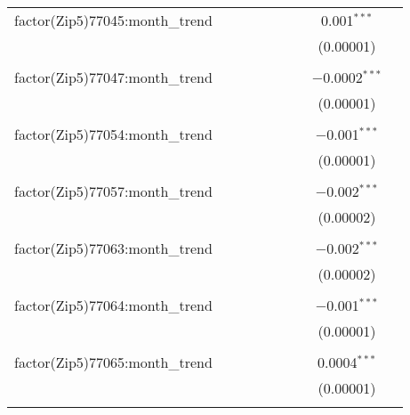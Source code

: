 \begin{table}[H]
{\begin{tabular}{@{\extracolsep{5pt}}lcccccccc}
  factor(Zip5)77045:month\_trend &  &  &  &  &  &  & 0.001$^{***}$ &  \\  

   &  &  &  &  &  &  & (0.00001) &  \\  

   & & & & & & & & \\  

  factor(Zip5)77047:month\_trend &  &  &  &  &  &  & $-$0.0002$^{***}$ &  \\  

   &  &  &  &  &  &  & (0.00001) &  \\  

   & & & & & & & & \\  

  factor(Zip5)77054:month\_trend &  &  &  &  &  &  & $-$0.001$^{***}$ &  \\  

   &  &  &  &  &  &  & (0.00001) &  \\  

   & & & & & & & & \\  

  factor(Zip5)77057:month\_trend &  &  &  &  &  &  & $-$0.002$^{***}$ &  \\  

   &  &  &  &  &  &  & (0.00002) &  \\  

   & & & & & & & & \\  

  factor(Zip5)77063:month\_trend &  &  &  &  &  &  & $-$0.002$^{***}$ &  \\  

   &  &  &  &  &  &  & (0.00002) &  \\  

   & & & & & & & & \\  

  factor(Zip5)77064:month\_trend &  &  &  &  &  &  & $-$0.001$^{***}$ &  \\  

   &  &  &  &  &  &  & (0.00001) &  \\  

   & & & & & & & & \\  

  factor(Zip5)77065:month\_trend &  &  &  &  &  &  & 0.0004$^{***}$ &  \\  

   &  &  &  &  &  &  & (0.00001) &  \\  

   & & & & & & & & \\  


\end{tabular}}
\end{table}
